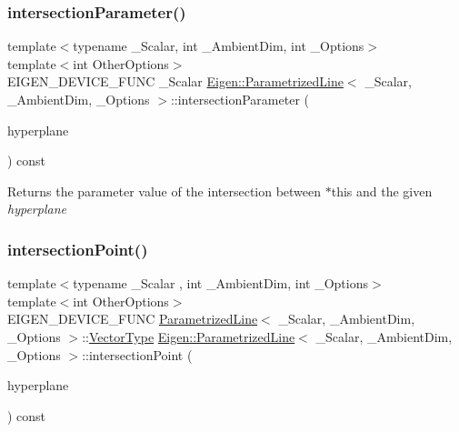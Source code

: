 \subsubsection{\texorpdfstring{intersectionParameter()}{intersectionParameter()}}
{\footnotesize\ttfamily template$<$typename \+\_\+\+Scalar, int \+\_\+\+Ambient\+Dim, int \+\_\+\+Options$>$ \\
template$<$int Other\+Options$>$ \\
E\+I\+G\+E\+N\+\_\+\+D\+E\+V\+I\+C\+E\+\_\+\+F\+U\+NC \+\_\+\+Scalar \mbox{\hyperlink{class_eigen_1_1_parametrized_line}{Eigen\+::\+Parametrized\+Line}}$<$ \+\_\+\+Scalar, \+\_\+\+Ambient\+Dim, \+\_\+\+Options $>$\+::intersection\+Parameter (\begin{DoxyParamCaption}\item[{const \mbox{\hyperlink{class_eigen_1_1_hyperplane}{Hyperplane}}$<$ \+\_\+\+Scalar, \+\_\+\+Ambient\+Dim, Other\+Options $>$ \&}]{hyperplane }\end{DoxyParamCaption}) const\hspace{0.3cm}{\ttfamily [inline]}}

\begin{DoxyReturn}{Returns}
the parameter value of the intersection between {\ttfamily $\ast$this} and the given {\itshape hyperplane} 
\end{DoxyReturn}
\mbox{\label{class_eigen_1_1_parametrized_line_a9319102677fc48d2208c949f448f4829}} 
\subsubsection{\texorpdfstring{intersectionPoint()}{intersectionPoint()}}
{\footnotesize\ttfamily template$<$typename \+\_\+\+Scalar , int \+\_\+\+Ambient\+Dim, int \+\_\+\+Options$>$ \\
template$<$int Other\+Options$>$ \\
E\+I\+G\+E\+N\+\_\+\+D\+E\+V\+I\+C\+E\+\_\+\+F\+U\+NC \mbox{\hyperlink{class_eigen_1_1_parametrized_line}{Parametrized\+Line}}$<$ \+\_\+\+Scalar, \+\_\+\+Ambient\+Dim, \+\_\+\+Options $>$\+::\mbox{\hyperlink{class_eigen_1_1_matrix}{Vector\+Type}} \mbox{\hyperlink{class_eigen_1_1_parametrized_line}{Eigen\+::\+Parametrized\+Line}}$<$ \+\_\+\+Scalar, \+\_\+\+Ambient\+Dim, \+\_\+\+Options $>$\+::intersection\+Point (\begin{DoxyParamCaption}\item[{const \mbox{\hyperlink{class_eigen_1_1_hyperplane}{Hyperplane}}$<$ \+\_\+\+Scalar, \+\_\+\+Ambient\+Dim, Other\+Options $>$ \&}]{hyperplane }\end{DoxyParamCaption}) const\hspace{0.3cm}{\ttfamily [inline]}}

